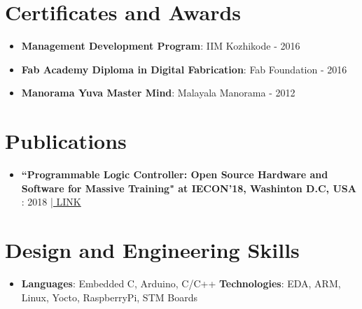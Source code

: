 \documentclass[a4paper,10pt]{article}
\newcommand{\resumeItem}[2]{
  \item\small{
    \textbf{#1}{: #2 \vspace{-2pt}}
  }
}
\newcommand{\resumeSubItem}[2]{\resumeItem{#1}{#2}\vspace{-4pt}}
\newcommand{\resumeSubHeadingListStart}{\begin{itemize}[leftmargin=*]}
\newcommand{\resumeSubHeadingListEnd}{\end{itemize}}
\begin{document}
\section{Certificates and Awards}
  \resumeSubHeadingListStart
    \resumeSubItem{Management Development Program}{IIM Kozhikode - 2016}
    \resumeSubItem{Fab Academy Diploma in Digital Fabrication}{Fab Foundation - 2016}
    \resumeSubItem{Manorama Yuva Master Mind}{Malayala Manorama - 2012}
  \resumeSubHeadingListEnd

\section{Publications}
  \resumeSubHeadingListStart
    \resumeSubItem{``Programmable Logic Controller: Open Source
Hardware and Software for Massive Training" at IECON'18, Washinton D.C, USA }{2018} \href{https://ieeexplore.ieee.org/abstract/document/8592772/}{| LINK}
  \resumeSubHeadingListEnd


\section{Design and Engineering Skills}
 \resumeSubHeadingListStart
   \item{
     \textbf{Languages}{: Embedded C, Arduino, C/C++}
     \hfill
     \textbf{Technologies}{: EDA, ARM, Linux, Yocto, RaspberryPi, STM Boards}
   }
 \resumeSubHeadingListEnd


\end{document}
